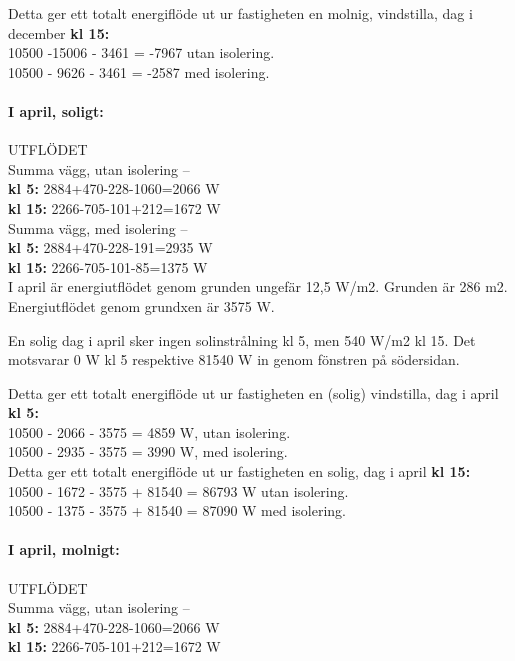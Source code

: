 Detta ger ett totalt energiflöde ut ur fastigheten en molnig, vindstilla, dag i december \textbf{kl 15:}\\
10500 -15006 - 3461 = -7967 utan isolering.\\
10500 - 9626 - 3461 = -2587 med isolering.\\


\paragraph{I april, soligt:}
UTFLÖDET\\
Summa vägg, utan isolering –\\
\textbf{kl 5:} 2884+470-228-1060=2066 W\\
\textbf{kl 15:} 2266-705-101+212=1672 W\\

Summa vägg, med isolering –\\
\textbf{kl 5:} 2884+470-228-191=2935 W\\
\textbf{kl 15:} 2266-705-101-85=1375 W\\

I april är energiutflödet genom grunden ungefär 12,5 W/m2. Grunden är 286 m2.\\
Energiutflödet genom grundxen är 3575 W.

En solig dag i april sker ingen solinstrålning kl 5, men 540 W/m2 kl 15. Det motsvarar 0 W kl 5 respektive 81540 W in genom fönstren på södersidan.

Detta ger ett totalt energiflöde ut ur fastigheten en (solig) vindstilla, dag i april \textbf{kl 5:}\\
10500 - 2066 - 3575 =  4859 W, utan isolering.\\
10500 - 2935 - 3575 =  3990 W, med isolering.\\

Detta ger ett totalt energiflöde ut ur fastigheten en solig, dag i april \textbf{kl 15:}\\
10500 - 1672 - 3575 + 81540 = 86793 W utan isolering.\\
10500 - 1375 - 3575 + 81540  =  87090 W med isolering.\\



\paragraph{I april, molnigt:}
UTFLÖDET\\
Summa vägg, utan isolering –\\
\textbf{kl 5:} 2884+470-228-1060=2066 W\\
\textbf{kl 15:} 2266-705-101+212=1672 W\\

